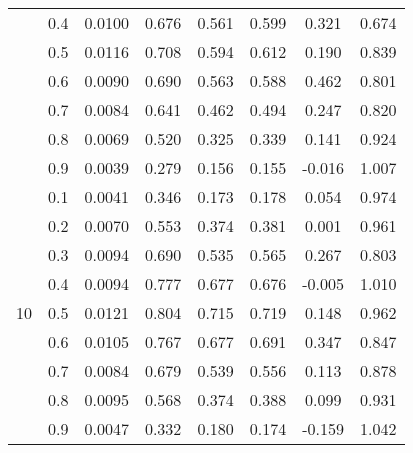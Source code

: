 \documentclass[11pt,a4paper]{report}
\begin{document}
\begin{longtable}{ | c | c || c | c | c | c | c | c | }
 & 0.4 & 0.0100 & 0.676 & 0.561 & 0.599 & 0.321 & 0.674 \\
 & 0.5 & 0.0116 & 0.708 & 0.594 & 0.612 & 0.190 & 0.839 \\
 & 0.6 & 0.0090 & 0.690 & 0.563 & 0.588 & 0.462 & 0.801 \\
 & 0.7 & 0.0084 & 0.641 & 0.462 & 0.494 & 0.247 & 0.820 \\
 & 0.8 & 0.0069 & 0.520 & 0.325 & 0.339 & 0.141 & 0.924 \\
 & 0.9 & 0.0039 & 0.279 & 0.156 & 0.155 & -0.016 & 1.007 \\
 \hline
\multirow{9}{*}{10} & 0.1 & 0.0041 & 0.346 & 0.173 & 0.178 & 0.054 & 0.974 \\
 & 0.2 & 0.0070 & 0.553 & 0.374 & 0.381 & 0.001 & 0.961 \\
 & 0.3 & 0.0094 & 0.690 & 0.535 & 0.565 & 0.267 & 0.803 \\
 & 0.4 & 0.0094 & 0.777 & 0.677 & 0.676 & -0.005 & 1.010 \\
 & 0.5 & 0.0121 & 0.804 & 0.715 & 0.719 & 0.148 & 0.962 \\
 & 0.6 & 0.0105 & 0.767 & 0.677 & 0.691 & 0.347 & 0.847 \\
 & 0.7 & 0.0084 & 0.679 & 0.539 & 0.556 & 0.113 & 0.878 \\
 & 0.8 & 0.0095 & 0.568 & 0.374 & 0.388 & 0.099 & 0.931 \\
 & 0.9 & 0.0047 & 0.332 & 0.180 & 0.174 & -0.159 & 1.042 \\
 \hline
\hline
\end{longtable}
\end{document}
